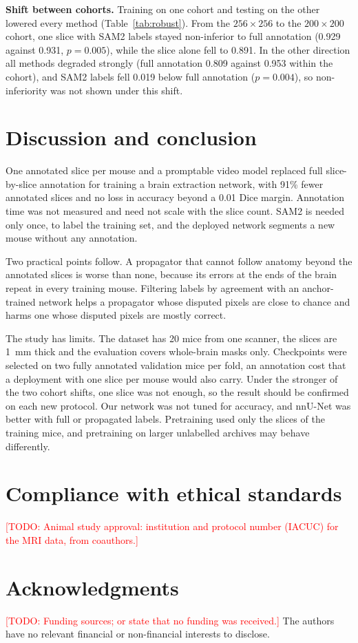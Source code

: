 \documentclass{article}
\newcommand{\todo}[1]{\textcolor{red}{[TODO: #1]}}
\begin{document}
\textbf{Shift between cohorts.} Training on one cohort and testing on the other lowered every method (Table~\ref{tab:robust}). From the $256\times256$ to the $200\times200$ cohort, one slice with SAM2 labels stayed non-inferior to full annotation (0.929 against 0.931, $p=0.005$), while the slice alone fell to 0.891. In the other direction all methods degraded strongly (full annotation 0.809 against 0.953 within the cohort), and SAM2 labels fell 0.019 below full annotation ($p=0.004$), so non-inferiority was not shown under this shift.

\section{Discussion and conclusion}
\label{sec:discussion}
One annotated slice per mouse and a promptable video model replaced full slice-by-slice annotation for training a brain extraction network, with 91\% fewer annotated slices and no loss in accuracy beyond a 0.01 Dice margin. Annotation time was not measured and need not scale with the slice count. SAM2 is needed only once, to label the training set, and the deployed network segments a new mouse without any annotation.

Two practical points follow. A propagator that cannot follow anatomy beyond the annotated slices is worse than none, because its errors at the ends of the brain repeat in every training mouse. Filtering labels by agreement with an anchor-trained network helps a propagator whose disputed pixels are close to chance and harms one whose disputed pixels are mostly correct.

The study has limits. The dataset has 20 mice from one scanner, the slices are 1~mm thick and the evaluation covers whole-brain masks only. Checkpoints were selected on two fully annotated validation mice per fold, an annotation cost that a deployment with one slice per mouse would also carry. Under the stronger of the two cohort shifts, one slice was not enough, so the result should be confirmed on each new protocol. Our network was not tuned for accuracy, and nnU-Net was better with full or propagated labels. Pretraining used only the slices of the training mice, and pretraining on larger unlabelled archives may behave differently.

\section{Compliance with ethical standards}
\label{sec:ethics}
\todo{Animal study approval: institution and protocol number (IACUC) for the MRI data, from coauthors.}

\section{Acknowledgments}
\label{sec:acknowledgments}
\todo{Funding sources; or state that no funding was received.} The authors have no relevant financial or non-financial interests to disclose.



\end{document}
